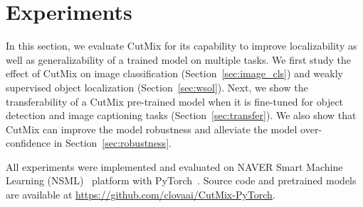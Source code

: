 

\section{Experiments}
\label{sec:experiments}
In this section, 
we evaluate CutMix for its {capability} to improve localizability as well as generalizability of {a} trained {model on multiple tasks.}
We first study the effect of CutMix on image classification (Section~\ref{sec:image_cls}) and weakly supervised object localization (Section~\ref{sec:wsol}).
{Next, we show the transferability of a CutMix pre-trained model} when it is fine-tuned for object detection and image captioning tasks (Section~\ref{sec:transfer}). 
{We also show that CutMix can improve the model robustness and alleviate the model over-confidence in Section~\ref{sec:robustness}.}

All experiments were implemented and evaluated on NAVER Smart Machine Learning (NSML)~\cite{nsml} platform with PyTorch~\cite{paszke2017automatic}. Source code and pretrained models are available at \href{https://github.com/clovaai/CutMix-PyTorch}{https://github.com/clovaai/CutMix-PyTorch}.